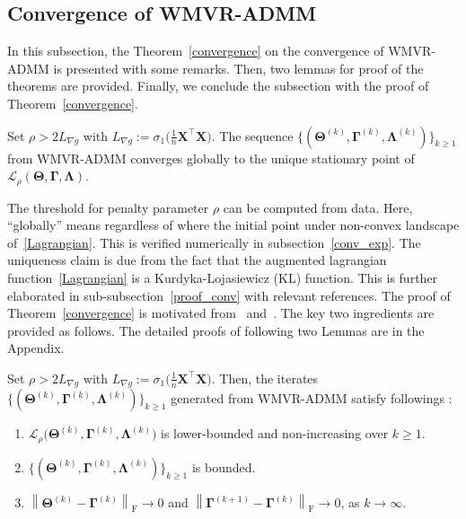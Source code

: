 \documentclass[alpha-refs]{wiley-article}
\begin{document}
\subsection{Convergence of WMVR-ADMM}
In this subsection, the Theorem~\ref{convergence} on the convergence of WMVR-ADMM is presented with some remarks.
Then, two lemmas for proof of the theorems are provided.
Finally, we conclude the subsection with the proof of Theorem~\ref{convergence}.

\begin{theorem} \label{convergence}
    Set $\rho>2L_{\nabla g}$ with $L_{\nabla g}:=\sigma_{1}\big( \frac{1}{n}\boldsymbol{X}^{\top}\boldsymbol{X}\big)$.
    The sequence $\{(\boldsymbol{\Theta}^{(k)},\boldsymbol{\Gamma}^{(k)},\boldsymbol{\Lambda}^{(k)})\}_{k \geq 1}$ from WMVR-ADMM converges globally to the unique stationary point of $\mathcal{L}_{\rho}(\boldsymbol{\Theta},\boldsymbol{\Gamma},\boldsymbol{\Lambda})$.
\end{theorem}

The threshold for penalty parameter $\rho$ can be computed from data.
Here, ``globally'' means regardless of where the initial point under non-convex landscape of~\eqref{Lagrangian}.
This is verified numerically in subsection~\ref{conv_exp}.
The uniqueness claim is due from the fact that the augmented lagrangian function~\eqref{Lagrangian} is a Kurdyka-Lojasiewicz (KL) function.
This is further elaborated in sub-subsection~\ref{proof_conv} with relevant references.
The proof of Theorem~\ref{convergence} is motivated from~\citet{wang2019global} and~\citet{kim2020cauchy}.
The key two ingredients are provided as follows.
The detailed proofs of following two Lemmas are in the Appendix. 
\begin{lemma} \label{Lemma2.3}
Set $\rho>2L_{\nabla g}$ with $L_{\nabla g}:=\sigma_{1}\big( \frac{1}{n}\boldsymbol{X}^{\top}\boldsymbol{X}\big)$.
Then, the iterates $\{(\boldsymbol{\Theta}^{(k)},\boldsymbol{\Gamma}^{(k)},\boldsymbol{\Lambda}^{(k)})\}_{k \geq 1}$ generated from WMVR-ADMM satisfy followings : 
\begin{enumerate}
    \item $\mathcal{L}_{\rho} \big( \boldsymbol{\Theta}^{(k)},\boldsymbol{\Gamma}^{(k)},\boldsymbol{\Lambda}^{(k)} \big)$ is lower-bounded and non-increasing over $k \geq 1$.
    \item $\{(\boldsymbol{\Theta}^{(k)},\boldsymbol{\Gamma}^{(k)},\boldsymbol{\Lambda}^{(k)})\}_{k \geq 1}$ is bounded.
    \item $\left\| \boldsymbol{\Theta}^{(k)} - \boldsymbol{\Gamma}^{(k)} \right\|_{\text{F}}\rightarrow{0}$ \quad and 
    \quad $\left\| \boldsymbol{\Gamma}^{(k+1)} - \boldsymbol{\Gamma}^{(k)} \right\|_{\text{F}}\rightarrow{0}$, \quad as
    $k\rightarrow{\infty}$.
\end{enumerate}
\end{lemma}
\end{document}
